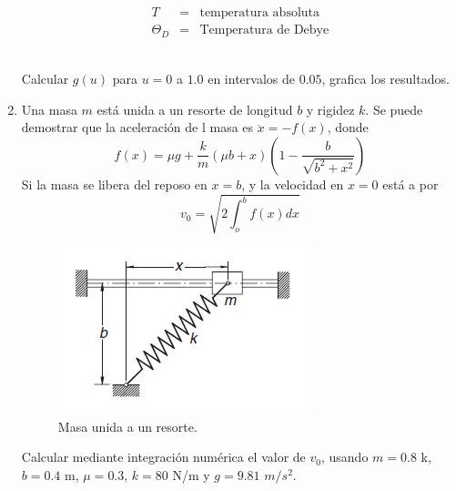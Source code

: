 \documentclass[11pt]{article}
\begin{document}
\begin{enumerate}
\begin{minipage}{4cm}
\begin{eqnarray*}
T &=& \text{temperatura absoluta} \\
\Theta_{D} &=& \text{Temperatura de Debye}
\end{eqnarray*}
\end{minipage}
\\
Calcular $g(u)$ para $u=0$ a $1.0$ en intervalos de $0.05$, grafica los resultados.
\item Una masa $m$ est\'{a} unida a un resorte de longitud $b$ y rigidez $k$. Se puede demostrar que la aceleraci\'{o}n de l masa es $\ddot{x} = -f(x)$, donde
\[f(x) = \mu g + \dfrac{k}{m} (\mu b + x) \left( 1 - \dfrac{b}{\sqrt{b^{2} + x^{2}}} \right)\]
Si la masa se libera del reposo en $x=b$, y la velocidad en $x=0$ est\'{a} a por
\[ v_{0} = \sqrt{2 \int_{o}^{b} f(x) dx}\]
\begin{figure}[H]
	\centering
	\includegraphics[scale=0.45]{Imagenes/Integral_02_Resorte.jpg}
	\caption{Masa unida a un resorte.}
\end{figure}
Calcular mediante integraci\'{o}n num\'{e}rica el valor de $v_{0}$, usando $m=0.8$ k, $b=0.4$ m, $\mu=0.3$, $k=80$ N/m y $g=9.81$ $m/s^{2}$.
\end{enumerate}
\end{document}

